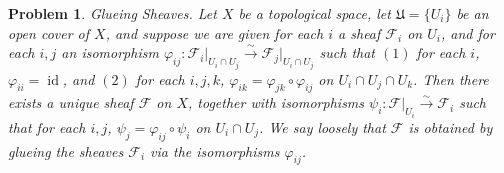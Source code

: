\documentclass[12pt,letterpaper]{article}
\newtheorem{problem}{Problem}[section]
\theoremstyle{definition}
\theoremstyle{remark}
\numberwithin{equation}{section}
\numberwithin{figure}{problem}
\DeclareMathOperator{\id}{id}
\newcommand{\isoto}{\overset{\sim}{\to}}%
\begin{document}
\begin{problem}
  \emph{Glueing Sheaves}. Let $X$ be a topological space, let $\mathfrak{U} = \{U_i\}$ be an open cover of $X$, and suppose we are given for each $i$ a sheaf $\mathscr{F}_i$ on $U_i$, and for each $i,j$ an isomorphism $\varphi_{ij}\colon \mathscr{F}_i\vert_{U_i \cap U_j} \isoto \mathscr{F}_j\vert_{U_i \cap U_j}$ such that $(1)$ for each $i$, $\varphi_{ii} = \id$, and $(2)$ for each $i,j,k$, $\varphi_{ik} = \varphi_{jk} \circ \varphi_{ij}$ on $U_i \cap U_j \cap U_k$. Then there exists a unique sheaf $\mathscr{F}$ on $X$, together with isomorphisms $\psi_i \colon \mathscr{F}\vert_{U_i} \isoto \mathscr{F}_i$ such that for each $i,j$, $\psi_j = \varphi_{ij} \circ \psi_i$ on $U_i \cap U_j$. We say loosely that $\mathscr{F}$ is obtained by \emph{glueing} the sheaves $\mathscr{F}_i$ via the isomorphisms $\varphi_{ij}$.
\end{problem}
\end{document}

